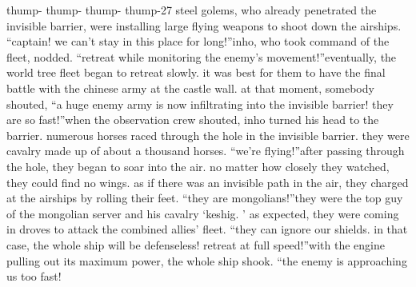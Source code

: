 thump- thump- thump- thump-27 steel golems, who already penetrated the invisible barrier, were installing large flying weapons to shoot down the airships.
“captain! we can’t stay in this place for long!”inho, who took command of the fleet, nodded.
“retreat while monitoring the enemy’s movement!”eventually, the world tree fleet began to retreat slowly.
 it was best for them to have the final battle with the chinese army at the castle wall.
at that moment, somebody shouted, “a huge enemy army is now infiltrating into the invisible barrier! they are so fast!”when the observation crew shouted, inho turned his head to the barrier.
 numerous horses raced through the hole in the invisible barrier.
 they were cavalry made up of about a thousand horses.
“we’re flying!”after passing through the hole, they began to soar into the air.
no matter how closely they watched, they could find no wings.
 as if there was an invisible path in the air, they charged at the airships by rolling their feet.
“they are mongolians!”they were the top guy of the mongolian server and his cavalry ‘keshig.
’ as expected, they were coming in droves to attack the combined allies’ fleet.
“they can ignore our shields.
 in that case, the whole ship will be defenseless! retreat at full speed!”with the engine pulling out its maximum power, the whole ship shook.
“the enemy is approaching us too fast!

 
